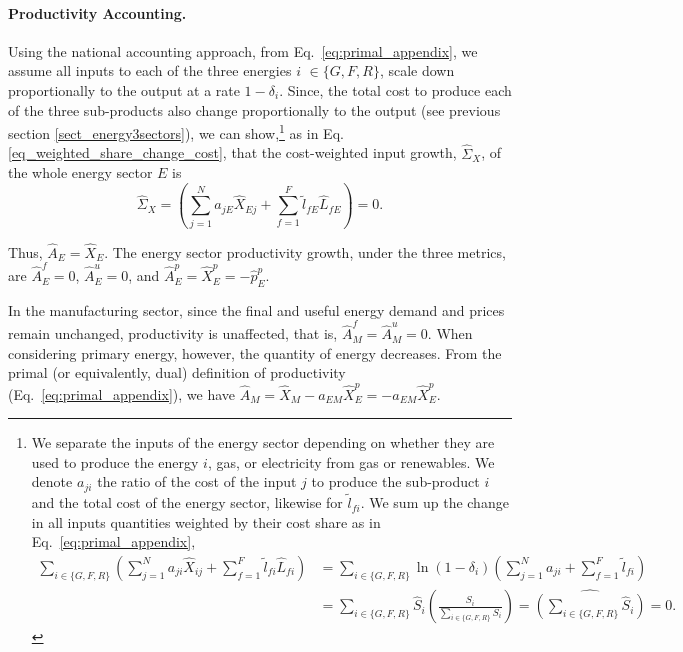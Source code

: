 \documentclass[11pt]{article}
\begin{document}
\paragraph{Productivity Accounting.} Using the national accounting approach, from Eq.~\ref{eq:primal_appendix},  we assume all inputs to each of the three energies $i$ $\in \{G,F,R\}$, scale down proportionally to the output at a rate $1-\delta_i$. Since, the total cost to produce each of the three sub-products also change proportionally to the output (see previous section \ref{sect_energy3sectors}), we can show,\footnote{
We separate the inputs of the energy sector depending on whether they are used to produce the energy $i$, gas, or electricity from gas or renewables. We denote $a_{ji}$ the ratio of the cost of  the input $j$ to produce the sub-product $i$ and the total cost of the energy sector, likewise for $\tilde{l}_{fi}$. We sum up the change in all inputs quantities weighted by their cost share as in Eq.~\ref{eq:primal_appendix},
\begin{equation*}
\begin{aligned}
\sum_{i\in \{G,F,R\}}\left( \sum_{j=1}^N a_{ji} \hat{X}_{ij}  +  \sum_{f=1}^F \tilde{l}_{fi} \hat{L}_{fi}\right)&=
\sum_{i\in \{G,F,R\}}\ln(1-\delta_i)\left( \sum_{j=1}^N a_{ji}   +  \sum_{f=1}^F \tilde{l}_{fi}\right)\\&=
 \sum_{i\in \{G,F,R\}}\hat{S}_i\left( \frac{S_i}{\sum_{i\in \{G,F,R\}} S_i }\right)=
\widehat{\left(\sum_{i\in \{G,F,R\}}\hat{S}_i\right)}= 
 0.
\end{aligned}
\end{equation*}
} 
as in Eq. \eqref{eq_weighted_share_change_cost}, that the cost-weighted input growth, $\hat{\Sigma}_X$, of the whole energy sector $E$ is 
\begin{equation}
\label{eq_weighted_share_PGR}
   \hat{\Sigma}_X= \left(\sum_{j=1}^N a_{jE} \hat{X}_{Ej}  +  \sum_{f=1}^F \tilde{l}_{fE} \hat{L}_{fE}\right)=0.
\end{equation}

Thus, $\hat{A}_E=\hat{X}_E$. The energy sector productivity growth, under the three metrics, are $\hat{A}_E^f = 0$, $\hat{A}_E^u = 0$, and $\hat{A}_E^p =\hat{X}_E^p=-\hat{p}_E^p$.

In the manufacturing sector, since the final and useful energy demand and prices remain unchanged, productivity is unaffected, that is, $\hat{A}_M^f = \hat{A}_M^u = 0$. When considering primary energy, however, the quantity of energy decreases. From the primal (or equivalently, dual) definition of productivity (Eq.~\ref{eq:primal_appendix}), we have $\hat{A}_M = \hat{X}_M - a_{EM} \hat{X}_E^p = -a_{EM} \hat{X}_E^p$.
\end{document}
